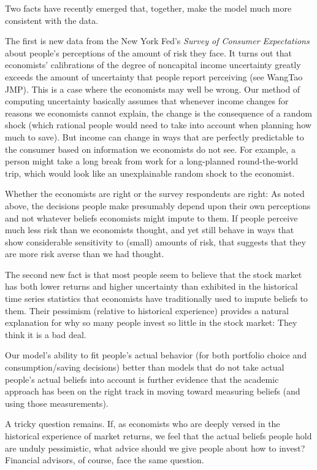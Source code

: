 \documentclass{article}
\begin{document}
Two facts have recently emerged that, together, make the model much more consistent with the data.

The first is new data from the New York Fed's \textit{Survey of Consumer Expectations} about people's perceptions of the amount of risk they face. It turns out that economists' calibrations of the degree of noncapital income uncertainty greatly exceeds the amount of uncertainty that people report perceiving (see WangTao JMP). This is a case where the economists may well be wrong. Our method of computing uncertainty basically assumes that whenever income changes for reasons we economists cannot explain, the change is the consequence of a random shock (which rational people would need to take into account when planning how much to save). But income can change in ways that are perfectly predictable to the consumer based on information we economists do not see. For example, a person might take a long break from work for a long-planned round-the-world trip, which would look like an unexplainable random shock to the economist.

Whether the economists are right or the survey respondents are right: As noted above, the decisions people make presumably depend upon their own perceptions and not whatever beliefs economists might impute to them. If people perceive much less risk than we economists thought, and yet still behave in ways that show considerable sensitivity to (small) amounts of risk, that suggests that they are more risk averse than we had thought.

The second new fact is that most people seem to believe that the stock market has both lower returns and higher uncertainty than exhibited in the historical time series statistics that economists have traditionally used to impute beliefs to them. Their pessimism (relative to historical experience) provides a natural explanation for why so many people invest so little in the stock market: They think it is a bad deal.

Our model's ability to fit people's actual behavior (for both portfolio choice and consumption/saving decisions) better than models that do not take actual people's actual beliefs into account is further evidence that the academic approach has been on the right track in moving toward measuring beliefs (and using those measurements).

A tricky question remains. If, as economists who are deeply versed in the historical experience of market returns, we feel that the actual beliefs people hold are unduly pessimistic, what advice should we give people about how to invest? Financial advisors, of course, face the same question.
\end{document}
